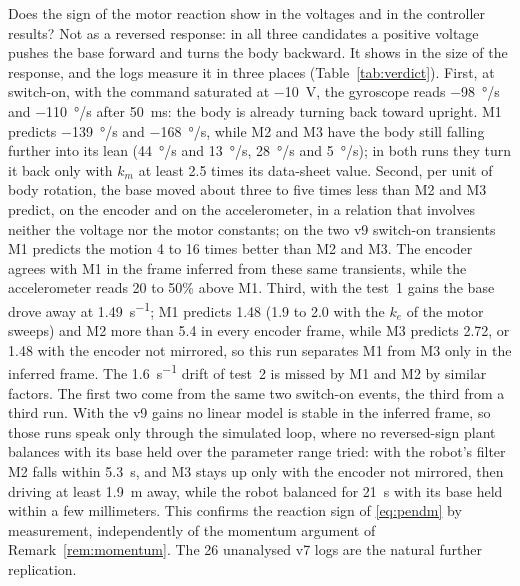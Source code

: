 Does the sign of the motor reaction show in the voltages and in the controller
results? Not as a reversed response: in all three candidates a positive voltage
pushes the base forward and turns the body backward. It shows in the size of
the response, and the logs measure it in three places
(Table~\ref{tab:verdict}). First, at switch-on, with the command saturated at
\SI{-10}{V}, the gyroscope reads \SI{-98}{\degree/s} and \SI{-110}{\degree/s}
after \SI{50}{ms}: the body is already turning back toward upright. M1
predicts \SI{-139}{\degree/s} and \SI{-168}{\degree/s}, while M2 and M3 have
the body still falling further into its lean (\SI{+44}{\degree/s} and
\SI{+13}{\degree/s}, \SI{+28}{\degree/s} and \SI{+5}{\degree/s}); in both runs
they turn it back only with $k_m$ at least 2.5 times its data-sheet value.
Second, per unit of body rotation, the base moved about three to five times
less than M2 and M3 predict, on the encoder and on the accelerometer, in a
relation that involves neither the voltage nor the motor constants; on the two
v9 switch-on transients M1 predicts the motion 4 to 16 times better than M2
and M3. The encoder agrees with M1 in the frame inferred from these same
transients, while the accelerometer reads 20 to 50\% above M1. Third, with the
test~1 gains the base drove away at \SI{1.49}{s^{-1}}; M1 predicts 1.48 (1.9
to 2.0 with the $k_e$ of the motor sweeps) and M2 more than 5.4 in every
encoder frame, while M3 predicts 2.72, or 1.48 with the encoder not mirrored,
so this run separates M1 from M3 only in the inferred frame. The
\SI{1.6}{s^{-1}} drift of test~2 is missed by M1 and M2 by similar factors.
The first two come from the same two switch-on events, the third from a third
run. With the v9 gains no linear model is stable in the inferred frame, so
those runs speak only through the simulated loop, where no reversed-sign plant
balances with its base held over the parameter range tried: with the robot's
filter M2 falls within \SI{5.3}{s}, and M3 stays up only with the encoder not
mirrored, then driving at least \SI{1.9}{m} away, while the robot balanced for
\SI{21}{s} with its base held within a few millimeters. This confirms the
reaction sign of \eqref{eq:pendm} by measurement, independently of the
momentum argument of Remark~\ref{rem:momentum}. The 26 unanalysed v7 logs are
the natural further replication.

